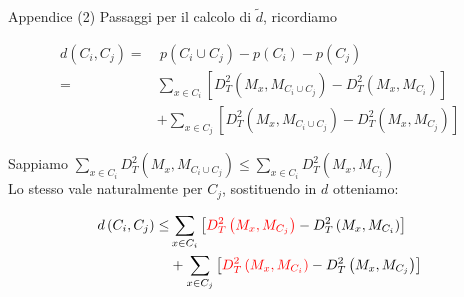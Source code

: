 \documentclass[usenames,dvipsnames,9pt]{beamer}
\theoremstyle{definition}
\begin{document}
\begin{frame}{Appendice (2)}
Passaggi per il calcolo di $\tilde{d}$, ricordiamo

\begin{equation*}
\begin{aligned}
d(C_i, C_j) =& \ p(C_i\cup C_j) - p(C_i) - p(C_j) \\
=& \sum_{x \in C_{i}} \left[D_{T}^{2}\left(M_{x}, M_{C_{i} \cup C_{j}}\right)- D_{T}^{2}\left(M_{x}, M_{C_{i}}\right)\right] \\
&+\sum_{x \in C_{j}} \left[D_{T}^{2}\left(M_{x}, M_{C_{i} \cup C_{j}}\right)-D_{T}^{2}\left(M_{x}, M_{C_{j}}\right)\right]
\end{aligned}
\end{equation*}

Sappiamo $\sum_{x \in C_{i}} D_{T}^{2}\left(M_{x}, M_{C_{i} \cup C_{j}}\right) \leq \sum_{x \in C_{i}} D_{T}^{2}\left(M_{x}, M_{C_{j}}\right)$ \\
Lo stesso vale naturalmente per $C_j$, sostituendo in $d$ otteniamo:

\begin{equation*}
\begin{aligned}
  d\left(C_{i}, C_{j}\right) \leq & \sum_{x \in C_{i}}\left[\textcolor{red}{D_{T}^{2}\left(M_{x}, M_{C_{j}}\right)}-D_{T}^{2}\left(M_{x}, M_{C_{i}}\right)\right] \\
  &+\sum_{x \in C_{j}}\left[\textcolor{red}{D_{T}^{2}\left(M_{x}, M_{C_{i}}\right)}-D_{T}^{2}\left(M_{x}, M_{C_{j}}\right)\right]
  \end{aligned}
\end{equation*}
\end{frame}
\end{document}
